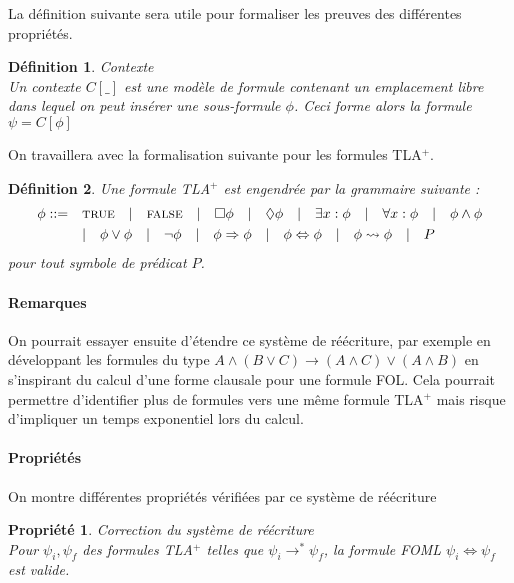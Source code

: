 \documentclass[12pt]{article}
\newcommand{\TRUE}{\textsc{true}}
\newcommand{\FALSE}{\textsc{false}}
\newtheorem{prop}{Propriété}
\newtheorem{defin}{Définition}
\begin{document}
La définition suivante sera utile pour formaliser les preuves des différentes propriétés.

\begin{defin} \emph{Contexte} \\
  Un contexte \( C[\_] \) est une modèle de formule contenant un emplacement libre dans lequel on peut insérer une sous-formule \( \phi \).
  Ceci forme alors la formule \( \psi = C[\phi] \)
\end{defin}

On travaillera avec la formalisation suivante pour les formules TLA$^+$.

\begin{defin}
  Une formule TLA$^+$ est engendrée par la grammaire suivante :
  \begin{align*}\phi ::= & \quad
    \TRUE \quad | \quad
    \FALSE \quad | \quad
    \Box \phi \quad | \quad
    \Diamond \phi \quad | \quad
    \exists x : \phi \quad | \quad
    \forall x : \phi \quad | \quad
                           \phi \land \phi \\
                         & \quad | \quad
    \phi \lor \phi \quad | \quad
    \neg \phi \quad | \quad
    \phi \Rightarrow \phi \quad | \quad
    \phi \Leftrightarrow \phi \quad | \quad
    \phi \leadsto \phi \quad | \quad
      P
  \end{align*}
  pour tout symbole de prédicat $P$.
\end{defin}

\paragraph{Remarques}

On pourrait essayer ensuite d'étendre ce système de réécriture, par exemple en développant les formules du type $A \land (B \lor C) \longrightarrow (A \land C) \lor (A \land B)$ en s'inspirant du calcul d'une forme clausale pour une formule FOL.
Cela pourrait permettre d'identifier plus de formules vers une même formule TLA$^+$ mais risque d'impliquer un temps exponentiel lors du calcul.


\paragraph{Propriétés}

On montre différentes propriétés vérifiées par ce système de réécriture

\begin{prop} \emph{Correction du système de réécriture} \\
  Pour $\psi_i, \psi_f$ des formules TLA$^+$ telles que $\psi_i \longrightarrow^* \psi_f$,
  la formule FOML $\psi_i \Leftrightarrow \psi_f$ est valide.
\end{prop}
\end{document}
